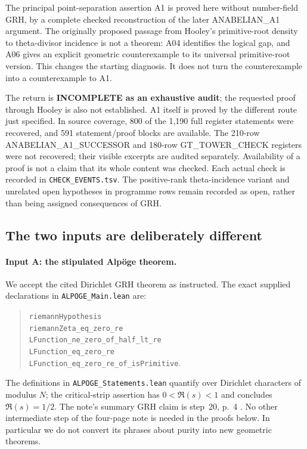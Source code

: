 \documentclass[11pt,a4paper]{article}
\begin{document}
The principal point-separation assertion A1 is proved here without
number-field GRH, by a complete checked reconstruction of the later
ANABELIAN\_A1 argument. The originally proposed passage from Hooley's
primitive-root density to theta-divisor incidence is not a theorem:
A04 identifies the logical gap, and A06 gives an explicit geometric
counterexample to its universal primitive-root version. This changes
the starting diagnosis. It does not turn the counterexample into a
counterexample to A1.

The return is \textbf{INCOMPLETE as an exhaustive audit}; the
requested proof through Hooley is also not established. A1 itself
is proved by the different route just specified. In source coverage,
800 of the 1,190 full register statements were recovered, and 591
statement/proof blocks are available. The 210-row
ANABELIAN\_A1\_SUCCESSOR and 180-row GT\_TOWER\_CHECK registers were not
recovered; their visible excerpts are audited separately. Availability
of a proof is not a claim that its whole content was checked. Each
actual check is recorded in \texttt{CHECK\_EVENTS.tsv}. The positive-rank
theta-incidence variant and unrelated open hypotheses in programme
rows remain recorded as open, rather than being assigned consequences
of GRH.

\subsection{The two inputs are deliberately different}

\paragraph{Input A: the stipulated Alp\"oge theorem.}
We accept the cited Dirichlet GRH theorem as instructed. The exact
supplied declarations in \texttt{ALPOGE\_Main.lean} are:
\begin{quote}\small\raggedright
\texttt{riemannHypothesis}\\
\texttt{riemannZeta\_eq\_zero\_re}\\
\texttt{LFunction\_ne\_zero\_of\_half\_lt\_re}\\
\texttt{LFunction\_eq\_zero\_re}\\
\texttt{LFunction\_eq\_zero\_re\_of\_isPrimitive}.
\end{quote}
The definitions in \texttt{ALPOGE\_Statements.lean} quantify over
Dirichlet characters of modulus $N$; the critical-strip assertion
has $0<\Re(s)<1$ and concludes $\Re(s)=1/2$.
The note's summary GRH claim is step~20, p.~4 \cite{Alpoge}.
No other intermediate step of the four-page note is needed in the
proofs below. In particular we do not convert its phrases about
purity into new geometric theorems.
\end{document}
